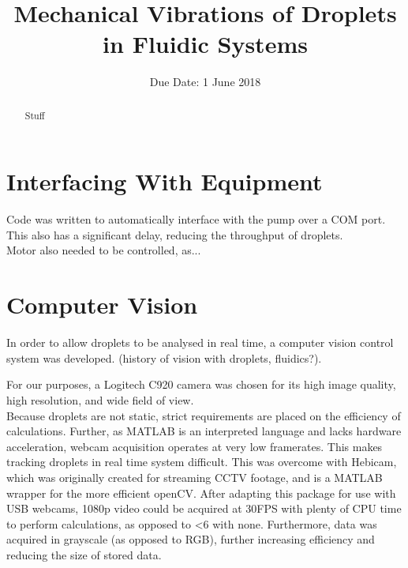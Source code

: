 \documentclass{physics_article_B}
\title{Mechanical Vibrations of Droplets in Fluidic Systems}
\date{Due Date: 1 June 2018}
\begin{document}
	
\setcounter{page}{0}
%

\begin{abstract}
	\large{Stuff
}
\end{abstract}
	

\tableofcontents

\setcounter{page}{1}
	
\newpage
{} 
\setcounter{page}{1}

\section{Interfacing With Equipment\label{sect_interface}}

Code was written to automatically interface with the pump over a COM port. This also has a significant delay, reducing the throughput of droplets.\\

Motor also needed to be controlled, as...

\section{Computer Vision\label{sect_vision}}

In order to allow droplets to be analysed in real time, a computer vision control system was developed. (history of vision with droplets, fluidics?).

For our purposes, a Logitech C920 camera was chosen for its high image quality, high resolution, and wide field of view. \\

Because droplets are not static, strict requirements are placed on the efficiency of calculations. Further, as MATLAB is an interpreted language and lacks hardware acceleration, webcam acquisition operates at very low framerates. This makes tracking droplets in real time system difficult. This was overcome with Hebicam\cite{HebiCam}, which was originally created for streaming CCTV footage, and is a MATLAB wrapper for the more efficient openCV. After adapting this package for use with USB webcams, 1080p video could be acquired at 30FPS with plenty of CPU time to perform calculations, as opposed to <6 with none. Furthermore, data was acquired in grayscale (as opposed to RGB), further increasing efficiency and reducing the size of stored data. \\
\end{document}
